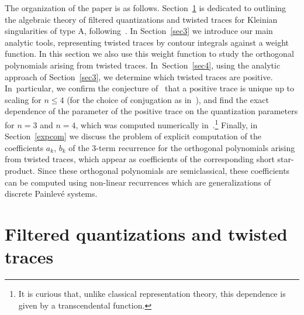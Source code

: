 \documentclass[10pt,a4paper]{amsart}
\theoremstyle{definition}
\numberwithin{equation}{section}
\begin{document}
The organization of the paper is as follows. Section~\ref{sec2} is dedicated to outlining the algebraic theory of filtered quantizations and twisted traces for Kleinian singularities of type A, following~\cite{ES}. In Section~\ref{sec3} we introduce our main analytic tools, representing twisted traces by contour integrals against a weight function. In this section we also use this weight function to study the orthogonal polynomials arising from twisted traces. In~Section~\ref{sec4}, using the analytic approach of Section~\ref{sec3}, we determine which twisted traces are positive. In~particular, we confirm the conjecture of~\cite{BPR} that a positive trace is unique up to scaling for $n\le 4$ (for the choice of conjugation as in~\cite{BPR}), and find the exact dependence of the parameter of the positive trace on the quantization parameters for $n=3$ and $n=4$, which was computed numerically in~\cite{BPR}.\footnote{It is curious that, unlike classical representation theory, this dependence is given by a transcendental function.}
Finally, in Section~\ref{expcom} we discuss the problem of explicit computation of the coefficients $a_k$, $b_k$
of the 3-term recurrence for the orthogonal polynomials arising from twisted traces, which
appear as coefficients of the corresponding short star-product. Since these orthogonal polynomials are semiclassical, these coefficients can be computed using non-linear recurrences which are generalizations of discrete Painlev\'e systems.



\section{Filtered quantizations and twisted traces}\label{sec2}
\end{document}
